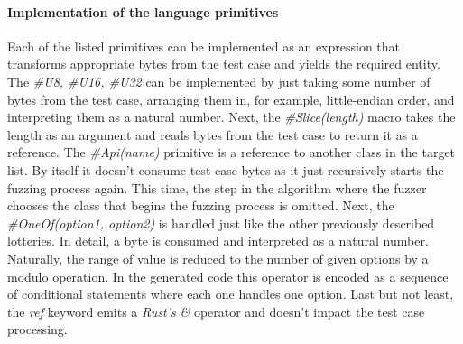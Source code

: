 \paragraph{Implementation of the language primitives}
Each of the listed primitives can be implemented as an expression that transforms appropriate bytes from the test case and yields the required entity. The \textit{\#U8, \#U16, \#U32} can be implemented by just taking some number of bytes from the test case, arranging them in, for example, little-endian order, and interpreting them as a natural number. Next, the \textit{\#Slice(length)} macro takes the length as an argument and reads bytes from the test case to return it as a reference. The \textit{\#Api(name)} primitive is a reference to another class in the target list. By itself it doesn't consume test case bytes as it just recursively starts the fuzzing process again. This time, the step in the algorithm where the fuzzer chooses the class that begins the fuzzing process is omitted. Next, the \textit{\#OneOf(option1, option2)} is handled just like the other previously described lotteries. In detail, a byte is consumed and interpreted as a natural number. Naturally, the range of value is reduced to the number of given options by a modulo operation. In the generated code this operator is encoded as a sequence of conditional statements where each one handles one option. Last but not least, the \textit{ref} keyword emits a \textit{Rust's} \textit{\&} operator and doesn't impact the test case processing.

